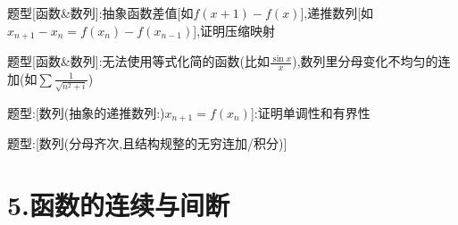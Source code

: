\documentclass[11pt,a4paper,UTF8]{ctexart}
\begin{document}
\begin{thmbox}[{解法[7]: [降维]微分/积分中值定理}]

题型[函数\&数列]:抽象函数差值[如$f(x+1) - f(x)$],递推数列[如$x_{n+1} - x_n = f(x_n) - f(x_{n-1})$],证明压缩映射

\end{thmbox}
\begin{thmbox}[{解法[8]: [夹逼]夹逼定理}]

题型[函数\&数列]:无法使用等式化简的函数(比如$\frac{\sin x}{x}$),数列里分母变化不均匀的连加(如$\sum \frac{1}{\sqrt{n^2+i}}$)

\end{thmbox}
\begin{thmbox}[{解法[9]: [夹逼]单调有界准则}]

题型:[数列(抽象的递推数列:)$x_{n+1} = f(x_n)$]:证明单调性和有界性

\end{thmbox}
\begin{thmbox}[{解法[10]: [夹逼]定积分定义}]

题型:[数列(分母齐次,且结构规整的无穷连加/积分)]

\end{thmbox}

\section{5.函数的连续与间断}
\end{document}
